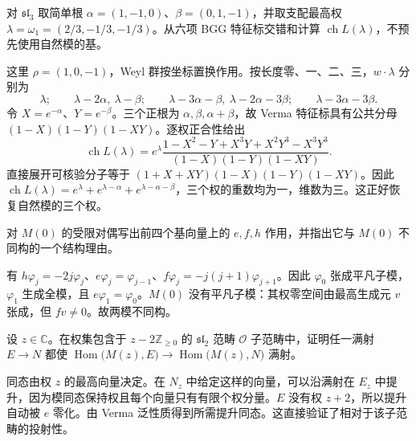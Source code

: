 \begin{optionalexercise}\label{b5:ex:20-bgg-character}
	对 \(\mathfrak{sl}_3\) 取简单根 \(\alpha=(1,-1,0)\)、\(\beta=(0,1,-1)\)，并取支配最高权 \(\lambda=\omega_1=(2/3,-1/3,-1/3)\)。从六项 BGG 特征标交错和计算 \(\operatorname{ch}L(\lambda)\)，不预先使用自然模的基。
\end{optionalexercise}
\begin{solution}
	这里 \(\rho=(1,0,-1)\)，Weyl 群按坐标置换作用。按长度零、一、二、三，\(w\mathbin{\cdot}\lambda\) 分别为
	\[
		\lambda;\qquad \lambda-2\alpha,\ \lambda-\beta;\qquad \lambda-3\alpha-\beta,\ \lambda-2\alpha-3\beta;\qquad \lambda-3\alpha-3\beta.
	\]
	令 \(X=e^{-\alpha}\)、\(Y=e^{-\beta}\)。三个正根为 \(\alpha,\beta,\alpha+\beta\)，故 Verma 特征标具有公共分母 \((1-X)(1-Y)(1-XY)\)。逐权正合性给出
	\[
		\operatorname{ch}L(\lambda) =e^\lambda\frac{1-X^2-Y+X^3Y+X^2Y^3-X^3Y^3} {(1-X)(1-Y)(1-XY)}.
	\]
	直接展开可核验分子等于 \((1+X+XY)(1-X)(1-Y)(1-XY)\)。因此 \(\operatorname{ch}L(\lambda)=e^\lambda+e^{\lambda-\alpha}+e^{\lambda-\alpha-\beta}\)，三个权的重数均为一，维数为三。这正好恢复自然模的三个权。
\end{solution}

\begin{optionalexercise}\label{b5:ex:20-restricted-dual}
	对 \(M(0)\) 的受限对偶写出前四个基向量上的 \(e,f,h\) 作用，并指出它与 \(M(0)\) 不同构的一个结构理由。
\end{optionalexercise}
\begin{solution}
	有 \(h\varphi_j=-2j\varphi_j\)、\(e\varphi_j=\varphi_{j-1}\)、\(f\varphi_j=-j(j+1)\varphi_{j+1}\)。因此 \(\varphi_0\) 张成平凡子模，\(\varphi_1\) 生成全模，且 \(e\varphi_1=\varphi_0\)。\(M(0)\) 没有平凡子模：其权零空间由最高生成元 \(v\) 张成，但 \(fv\ne0\)。故两模不同构。
\end{solution}

\begin{optionalexercise}\label{b5:ex:20-verma-projective-truncation}
	设 \(z\in\mathbb C\)。在权集包含于 \(z-2\mathbb Z_{\ge0}\) 的 \(\mathfrak{sl}_2\) 范畴 \(\mathcal O\) 子范畴中，证明任一满射 \(E\to N\) 都使 \(\operatorname{Hom}\bigl(M(z),E\bigr)\to\operatorname{Hom}\bigl(M(z),N\bigr)\) 满射。
\end{optionalexercise}
\begin{solution}
	同态由权 \(z\) 的最高向量决定。在 \(N_z\) 中给定这样的向量，可以沿满射在 \(E_z\) 中提升，因为模同态保持权且每个向量只有有限个权分量。\(E\) 没有权 \(z+2\)，所以提升自动被 \(e\) 零化。由 Verma 泛性质得到所需提升同态。这直接验证了相对于该子范畴的投射性。
\end{solution}

